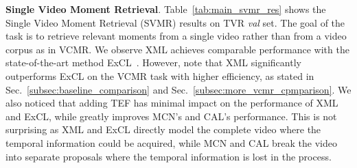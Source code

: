 \documentclass[runningheads]{llncs}
\newcommand{\ra}[1]{\renewcommand{\arraystretch}{#1}}
\begin{document}
\begin{table}[!t]
\setlength{\tabcolsep}{0.3em}
\ra{1.}
\centering
\small
\caption{Video retrieval results on TVR \textit{val} set. Model references: \textit{MCN}~\cite{anne2017localizing},
\textit{CAL}~\cite{escorcia2019temporal}, \textit{MEE}~\cite{miech2018learning}
}
\label{tab:main_vr_res}
\end{table}

\kern2mm
\noindent\textbf{Single Video Moment Retrieval}.
Table~\ref{tab:main_svmr_res} shows the Single Video Moment Retrieval (SVMR) results on TVR \textit{val} set. 
The goal of the task is to retrieve relevant moments from a single video rather than from a video corpus as in VCMR.
We observe XML achieves comparable performance with the state-of-the-art method ExCL~\cite{ghosh2019excl}. 
However, note that XML significantly outperforms ExCL on the VCMR task with higher efficiency, as stated in Sec.~\ref{subsec:baseline_comparison} and Sec.~\ref{subsec:more_vcmr_cpmparison}. We also noticed that adding TEF has minimal impact on the performance of XML and ExCL, while greatly improves MCN's and CAL's performance. This is not surprising as XML and ExCL directly model the complete video where the temporal information could be acquired, while MCN and CAL break the video into separate proposals where the temporal information is lost in the process.
\end{document}
